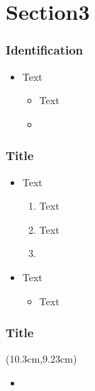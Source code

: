 \documentclass[13pt]{beamer}
\begin{document}
\section{Section3}
\setcounter{subsection}{1} %

\begin{frame}[label=identification]\frametitle{Identification}
\begin{itemize}		
	\item Text
	\begin{itemize}
		\item	Text
		\item 
	\end{itemize}
\end{itemize}
\end{frame}


\begin{frame}[label=title3]\frametitle{Title}
\begin{itemize}
\item Text
\begin{enumerate}		
	\item Text
	\pause\item Text
	\pause\item \end{enumerate}
\pause
	\item Text
	\begin{itemize}
		\item Text
	\end{itemize}
\end{itemize}
\end{frame}


\appendix 

{ %
\frame[plain]{}
} 
\addtocounter{framenumber}{-1}



\begin{frame}[plain, label=appendix1]\frametitle{Title}
    \begin{textblock*}{3cm}(10.3cm,9.23cm)
		\hyperlink{title1}{}
	\end{textblock*}
\begin{itemize}
	\item 
\end{itemize}
\end{frame}
\end{document}
